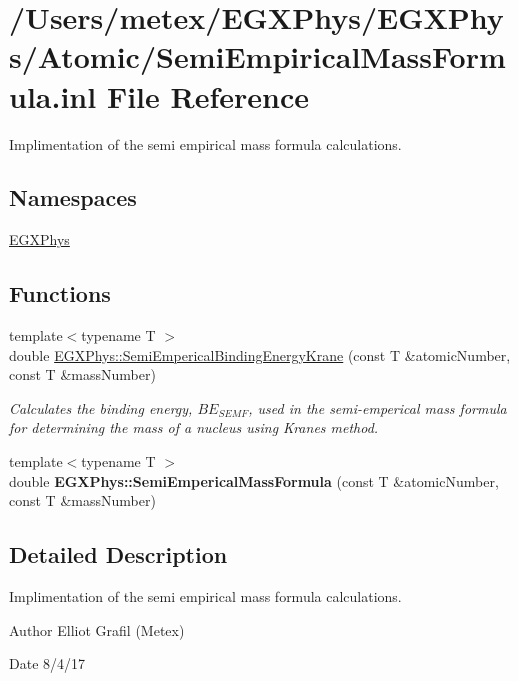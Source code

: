 \hypertarget{_semi_empirical_mass_formula_8inl}{}\section{/\+Users/metex/\+E\+G\+X\+Phys/\+E\+G\+X\+Phys/\+Atomic/\+Semi\+Empirical\+Mass\+Formula.inl File Reference}
\label{_semi_empirical_mass_formula_8inl}


Implimentation of the semi empirical mass formula calculations.  


\subsection*{Namespaces}
\begin{DoxyCompactItemize}
\item 
 \hyperlink{namespace_e_g_x_phys}{E\+G\+X\+Phys}
\end{DoxyCompactItemize}
\subsection*{Functions}
\begin{DoxyCompactItemize}
\item 
{\footnotesize template$<$typename T $>$ }\\double \hyperlink{group___semi_empirical_mass_formula_ga99c5a87be2c76d3fa4852654c3fd59a9}{E\+G\+X\+Phys\+::\+Semi\+Emperical\+Binding\+Energy\+Krane} (const T \&atomic\+Number, const T \&mass\+Number)
\begin{DoxyCompactList}\small\item\em Calculates the binding energy, $BE_{SEMF}$, used in the semi-\/emperical mass formula for determining the mass of a nucleus using Krane\textquotesingle{}s method. \end{DoxyCompactList}\item 
{\footnotesize template$<$typename T $>$ }\\double {\bfseries E\+G\+X\+Phys\+::\+Semi\+Emperical\+Mass\+Formula} (const T \&atomic\+Number, const T \&mass\+Number)
\end{DoxyCompactItemize}


\subsection{Detailed Description}
Implimentation of the semi empirical mass formula calculations. 

\begin{DoxyAuthor}{Author}
Elliot Grafil (Metex) 
\end{DoxyAuthor}
\begin{DoxyDate}{Date}
8/4/17 
\end{DoxyDate}
